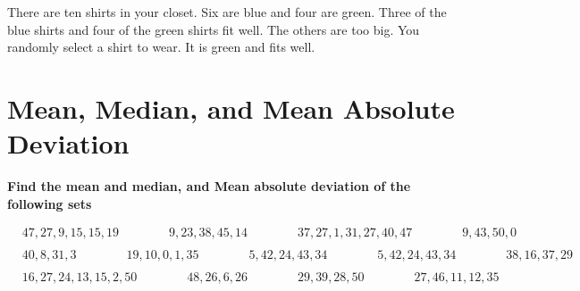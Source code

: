 \documentclass{article}
\begin{document}
	\bigskip

	\bigskip

	\indent There are ten shirts in your closet. Six are blue and four are green. Three of the blue shirts and four of the green shirts fit well. The others are too big. You randomly select a shirt to wear. It is green and fits well.

	\bigskip

	\bigskip



\bigskip
\section{Mean, Median, and Mean Absolute Deviation}
\bigskip
\textbf{Find the mean and median, and Mean absolute deviation of the following sets}
\bigskip

\(\begin{aligned}
	&{47,27,9,15,15,19} \qquad\qquad {9,23,38,45,14} \qquad\qquad {37,27,1,31,27,40,47} \qquad\qquad {9,43,50,0}\\\\
	&{40,8,31,3} \qquad\qquad {19,10,0,1,35} \qquad\qquad {5,42,24,43,34} \qquad\qquad {5,42,24,43,34} \qquad\qquad {38,16,37,29}\\\\
	&{16,27,24,13,15,2,50} \qquad\qquad {48,26,6,26} \qquad\qquad {29,39,28,50} \qquad\qquad {27,46,11,12,35}\\\\
\end{aligned}\)
\end{document}
